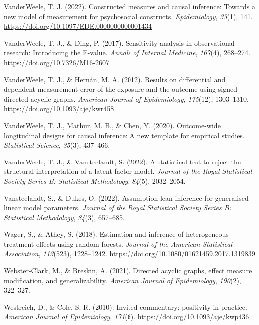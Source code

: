 \documentclass[
  single column]{article}
\newlength{\cslhangindent}
\newenvironment{CSLReferences}[2] %
 {\begin{list}{}{%
  \setlength{\itemindent}{0pt}
  \setlength{\leftmargin}{0pt}
  \setlength{\parsep}{0pt}
  \ifodd #1
   \setlength{\leftmargin}{\cslhangindent}
   \setlength{\itemindent}{-1\cslhangindent}
  \fi
  \setlength{\itemsep}{#2\baselineskip}}}
 {\end{list}}
\begin{document}
\begin{CSLReferences}{1}{0}
VanderWeele, T. J. (2022). Constructed measures and causal inference:
Towards a new model of measurement for psychosocial constructs.
\emph{Epidemiology}, \emph{33}(1), 141.
\url{https://doi.org/10.1097/EDE.0000000000001434}

VanderWeele, T. J., \& Ding, P. (2017). Sensitivity analysis in
observational research: Introducing the {E}-value. \emph{Annals of
Internal Medicine}, \emph{167}(4), 268--274.
\url{https://doi.org/10.7326/M16-2607}

VanderWeele, T. J., \& Hernán, M. A. (2012). Results on differential and
dependent measurement error of the exposure and the outcome using signed
directed acyclic graphs. \emph{American Journal of Epidemiology},
\emph{175}(12), 1303--1310. \url{https://doi.org/10.1093/aje/kwr458}

VanderWeele, T. J., Mathur, M. B., \& Chen, Y. (2020). Outcome-wide
longitudinal designs for causal inference: A new template for empirical
studies. \emph{Statistical Science}, \emph{35}(3), 437--466.

VanderWeele, T. J., \& Vansteelandt, S. (2022). A statistical test to
reject the structural interpretation of a latent factor model.
\emph{Journal of the Royal Statistical Society Series B: Statistical
Methodology}, \emph{84}(5), 2032--2054.

Vansteelandt, S., \& Dukes, O. (2022). Assumption-lean inference for
generalised linear model parameters. \emph{Journal of the Royal
Statistical Society Series B: Statistical Methodology}, \emph{84}(3),
657--685.

Wager, S., \& Athey, S. (2018). Estimation and inference of
heterogeneous treatment effects using random forests. \emph{Journal of
the American Statistical Association}, \emph{113}(523), 1228--1242.
\url{https://doi.org/10.1080/01621459.2017.1319839}

Webster-Clark, M., \& Breskin, A. (2021). Directed acyclic graphs,
effect measure modification, and generalizability. \emph{American
Journal of Epidemiology}, \emph{190}(2), 322--327.

Westreich, D., \& Cole, S. R. (2010). Invited commentary: positivity in
practice. \emph{American Journal of Epidemiology}, \emph{171}(6).
\url{https://doi.org/10.1093/aje/kwp436}


\end{CSLReferences}
\end{document}
